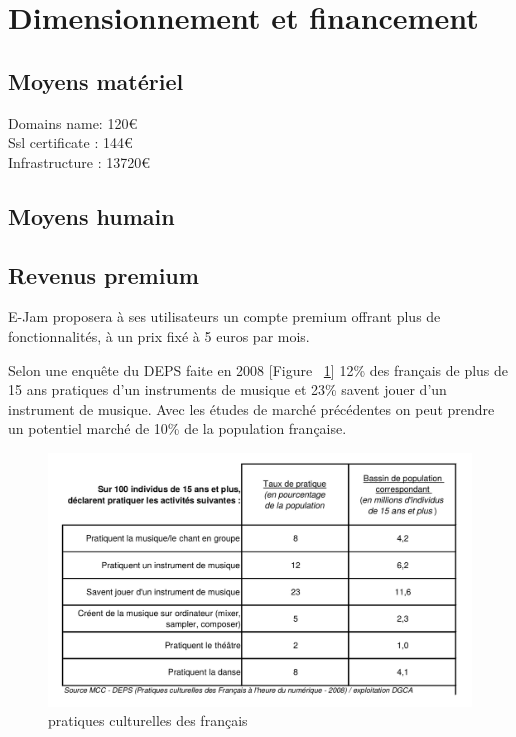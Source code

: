 \documentclass[a4,12pt]{article}
\begin{document}
\section{Dimensionnement et financement}


\subsection{Moyens matériel}

Domains name: 120\euro\\
Ssl certificate : 144\euro\\
Infrastructure : 13720\euro\\

\subsection{Moyens humain}

\subsection{Revenus premium}

E-Jam proposera à ses utilisateurs un compte premium offrant plus de fonctionnalités,
à un prix fixé à 5 euros par mois.

Selon une enquête du DEPS faite en 2008 [Figure ~\ref{fig:pratiques}]
12\% des français de plus de 15 ans pratiques d'un instruments de musique et 23\% savent
jouer d'un instrument de musique. Avec les études de marché précédentes on peut prendre un potentiel marché de 10\% de la population française.\\

\begin{figure}[!h]
    \centering
    \includegraphics[width=400pt]{pratiques_culturelles_des_francais.png}
    \caption{pratiques culturelles des français}
    \label{fig:pratiques}
\end{figure}
\end{document}
